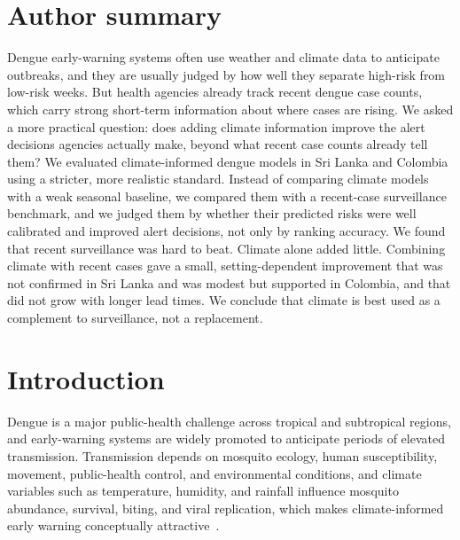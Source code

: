 \documentclass[11pt,a4paper]{article}
\begin{document}
\section*{Author summary}
Dengue early-warning systems often use weather and climate data to anticipate outbreaks, and they are usually judged by how well they separate high-risk from low-risk weeks. But health agencies already track recent dengue case counts, which carry strong short-term information about where cases are rising. We asked a more practical question: does adding climate information improve the alert decisions agencies actually make, beyond what recent case counts already tell them? We evaluated climate-informed dengue models in Sri Lanka and Colombia using a stricter, more realistic standard. Instead of comparing climate models with a weak seasonal baseline, we compared them with a recent-case surveillance benchmark, and we judged them by whether their predicted risks were well calibrated and improved alert decisions, not only by ranking accuracy. We found that recent surveillance was hard to beat. Climate alone added little. Combining climate with recent cases gave a small, setting-dependent improvement that was not confirmed in Sri Lanka and was modest but supported in Colombia, and that did not grow with longer lead times. We conclude that climate is best used as a complement to surveillance, not a replacement.

\section{Introduction}

Dengue is a major public-health challenge across tropical and subtropical regions, and early-warning systems are widely promoted to anticipate periods of elevated transmission. Transmission depends on mosquito ecology, human susceptibility, movement, public-health control, and environmental conditions, and climate variables such as temperature, humidity, and rainfall influence mosquito abundance, survival, biting, and viral replication, which makes climate-informed early warning conceptually attractive~\cite{Mordecai2017,Huber2018}.
\end{document}
